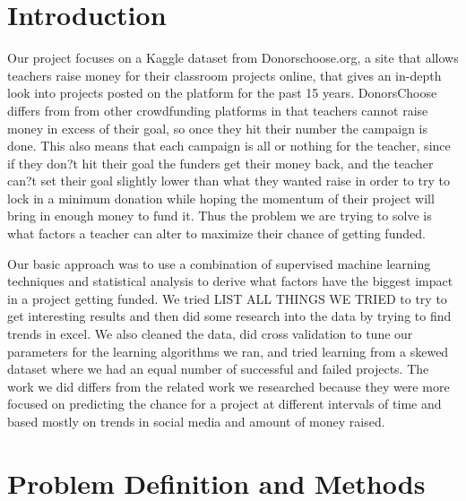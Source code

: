 \documentclass{article}
\begin{document}
 


\section{Introduction}
Our project focuses on a Kaggle dataset from Donorschoose.org, a site that allows teachers raise money for their classroom projects online, that gives an in-depth look into projects posted on the platform for the past 15 years. DonorsChoose differs from from other crowdfunding platforms in that teachers cannot raise money in excess of their goal, so once they hit their number the campaign is done. This also means that each campaign is all or nothing for the teacher, since if they don?t hit their goal the funders get their money back, and the teacher can?t set their goal slightly lower than what they wanted raise in order to try to lock in a minimum donation while hoping the momentum of their project will bring in enough money to fund it. Thus the problem we are trying to solve is what factors a teacher can alter to maximize their chance of getting funded. 

Our basic approach was to use a combination of supervised machine learning techniques and statistical analysis to derive what factors have the biggest impact in a project getting funded. We tried LIST ALL THINGS WE TRIED to try to get interesting results and then did some research into the data by trying to find trends in excel. We also cleaned the data, did cross validation to tune our parameters for the learning algorithms we ran, and tried learning from a skewed dataset where we had an equal number of successful and failed projects. The work we did differs from the related work we researched because they were more focused on predicting the chance for a project at different intervals of time and based mostly on trends in social media and amount of money raised.


\section{Problem Definition and Methods}
\end{document}
